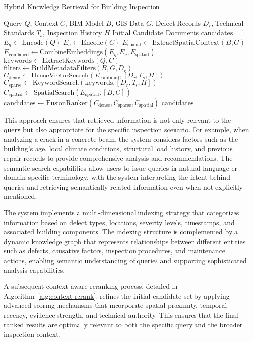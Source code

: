 \begin{algorithm}[htbp]
\caption{Hybrid Knowledge Retrieval for Building Inspection}
\label{alg:hybrid-retrieval}
\begin{algorithmic}[1]
\REQUIRE Query $Q$, Context $C$, BIM Model $B$, GIS Data $G$, Defect Records $D_r$, Technical Standards $T_s$, Inspection History $H$
\ENSURE Initial Candidate Documents $\text{candidates}$
\STATE $E_q \gets \text{Encode}(Q)$
\STATE $E_c \gets \text{Encode}(C)$
\STATE $E_{\text{spatial}} \gets \text{ExtractSpatialContext}(B, G)$
\STATE $E_{\text{combined}} \gets \text{CombineEmbeddings}(E_q, E_c, E_{\text{spatial}})$
\STATE $\text{keywords} \gets \text{ExtractKeywords}(Q, C)$
\STATE $\text{filters} \gets \text{BuildMetadataFilters}(B, G, D_r)$
\STATE $C_{\text{dense}} \gets \text{DenseVectorSearch}(E_{\text{combined}}, [D_r, T_s, H])$
\STATE $C_{\text{sparse}} \gets \text{KeywordSearch}(\text{keywords}, [D_r, T_s, H])$
\STATE $C_{\text{spatial}} \gets \text{SpatialSearch}(E_{\text{spatial}}, [B, G])$
\STATE $\text{candidates} \gets \text{FusionRanker}(C_{\text{dense}}, C_{\text{sparse}}, C_{\text{spatial}})$
\RETURN $\text{candidates}$
\end{algorithmic}
\end{algorithm}

This approach ensures that retrieved information is not only relevant to the query but also appropriate for the specific inspection scenario. For example, when analyzing a crack in a concrete beam, the system considers factors such as the building's age, local climate conditions, structural load history, and previous repair records to provide comprehensive analysis and recommendations. The semantic search capabilities allow users to issue queries in natural language or domain-specific terminology, with the system interpreting the intent behind queries and retrieving semantically related information even when not explicitly mentioned.

The system implements a multi-dimensional indexing strategy that categorizes information based on defect types, locations, severity levels, timestamps, and associated building components. The indexing structure is complemented by a dynamic knowledge graph that represents relationships between different entities such as defects, causative factors, inspection procedures, and maintenance actions, enabling semantic understanding of queries and supporting sophisticated analysis capabilities.

A subsequent context-aware reranking process, detailed in Algorithm~\ref{alg:context-rerank}, refines the initial candidate set by applying advanced scoring mechanisms that incorporate spatial proximity, temporal recency, evidence strength, and technical authority. This ensures that the final ranked results are optimally relevant to both the specific query and the broader inspection context.


